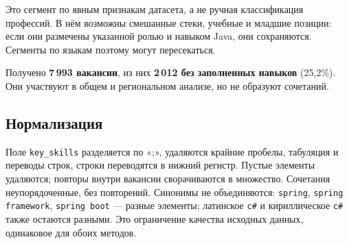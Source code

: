 \documentclass[11pt,a4paper]{article}
\begin{document}
Это сегмент по явным признакам датасета, а не ручная классификация профессий. В нём возможны смешанные стеки, учебные и младшие позиции: если они размечены указанной ролью и навыком Java, они сохраняются. Сегменты по языкам поэтому могут пересекаться.

Получено \textbf{7\,993 вакансии}, из них \textbf{2\,012 без заполненных навыков} (25,2\%). Они участвуют в общем и региональном анализе, но не образуют сочетаний.

\subsection{Нормализация}
Поле \texttt{key\_skills} разделяется по «;», удаляются крайние пробелы, табуляция и переводы строк, строки переводятся в нижний регистр. Пустые элементы удаляются; повторы внутри вакансии сворачиваются в множество. Сочетания неупорядоченные, без повторений. Синонимы не объединяются: \texttt{spring}, \texttt{spring framework}, \texttt{spring boot} --- разные элементы; латинское \texttt{c\#} и кириллическое \texttt{с\#} также остаются разными. Это ограничение качества исходных данных, одинаковое для обоих методов.

\clearpage
\end{document}
